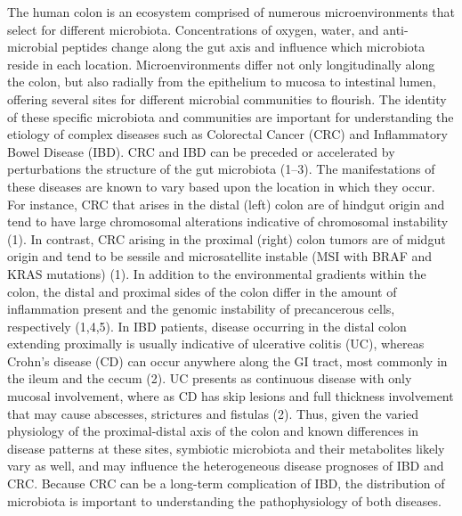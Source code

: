 \documentclass[12pt,]{article}
\begin{document}
The human colon is an ecosystem comprised of numerous microenvironments
that select for different microbiota. Concentrations of oxygen, water,
and anti-microbial peptides change along the gut axis and influence
which microbiota reside in each location. Microenvironments differ not
only longitudinally along the colon, but also radially from the
epithelium to mucosa to intestinal lumen, offering several sites for
different microbial communities to flourish. The identity of these
specific microbiota and communities are important for understanding the
etiology of complex diseases such as Colorectal Cancer (CRC) and
Inflammatory Bowel Disease (IBD). CRC and IBD can be preceded or
accelerated by perturbations the structure of the gut microbiota (1--3).
The manifestations of these diseases are known to vary based upon the
location in which they occur. For instance, CRC that arises in the
distal (left) colon are of hindgut origin and tend to have large
chromosomal alterations indicative of chromosomal instability (1). In
contrast, CRC arising in the proximal (right) colon tumors are of midgut
origin and tend to be sessile and microsatellite instable (MSI with BRAF
and KRAS mutations) (1). In addition to the environmental gradients
within the colon, the distal and proximal sides of the colon differ in
the amount of inflammation present and the genomic instability of
precancerous cells, respectively (1,4,5). In IBD patients, disease
occurring in the distal colon extending proximally is usually indicative
of ulcerative colitis (UC), whereas Crohn's disease (CD) can occur
anywhere along the GI tract, most commonly in the ileum and the cecum
(2). UC presents as continuous disease with only mucosal involvement,
where as CD has skip lesions and full thickness involvement that may
cause abscesses, strictures and fistulas (2). Thus, given the varied
physiology of the proximal-distal axis of the colon and known
differences in disease patterns at these sites, symbiotic microbiota and
their metabolites likely vary as well, and may influence the
heterogeneous disease prognoses of IBD and CRC. Because CRC can be a
long-term complication of IBD, the distribution of microbiota is
important to understanding the pathophysiology of both diseases.
\end{document}
